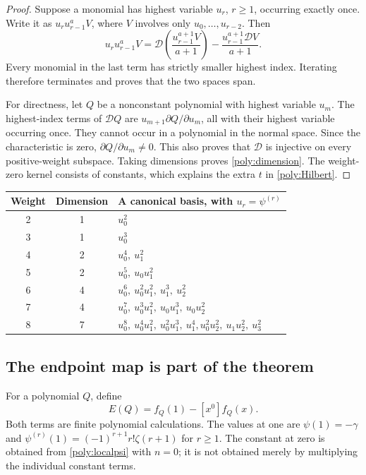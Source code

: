 \documentclass[11pt,a4paper]{article}
\numberwithin{equation}{section}
\theoremstyle{definition}
\theoremstyle{remark}
\newcommand{\cD}{\mathcal D}
\begin{document}
\begin{proof}
Suppose a monomial has highest variable $u_r$, $r\ge1$, occurring
exactly once. Write it as $u_r u_{r-1}^a V$, where $V$ involves
only $u_0,\ldots,u_{r-2}$. Then
\begin{equation}\label{poly:IBPstep}
 u_r u_{r-1}^aV=
 \cD\left(\frac{u_{r-1}^{a+1}V}{a+1}\right)
 -\frac{u_{r-1}^{a+1}\cD V}{a+1}.
\end{equation}
Every monomial in the last term has strictly smaller highest index.
Iterating therefore terminates and proves that the two spaces span.

For directness, let $Q$ be a nonconstant polynomial with highest
variable $u_m$. The highest-index terms of $\cD Q$ are
$u_{m+1}\partial Q/\partial u_m$, all with their highest variable
occurring once. They cannot occur in a polynomial in the normal space.
Since the characteristic is zero, $\partial Q/\partial u_m\ne0$.
This also proves that $\cD$ is injective on every positive-weight
subspace. Taking dimensions proves \eqref{poly:dimension}.
The weight-zero kernel consists of constants, which explains the extra
$t$ in \eqref{poly:Hilbert}.
\end{proof}

\begin{center}
\small
\begin{tabular}{ccl}
\toprule
Weight & Dimension & A canonical basis, with $u_r=\psi^{(r)}$\\
\midrule
2&1&$u_0^2$\\
3&1&$u_0^3$\\
4&2&$u_0^4,\ u_1^2$\\
5&2&$u_0^5,\ u_0u_1^2$\\
6&4&$u_0^6,\ u_0^2u_1^2,\ u_1^3,\ u_2^2$\\
7&4&$u_0^7,\ u_0^3u_1^2,\ u_0u_1^3,\ u_0u_2^2$\\
8&7&$u_0^8,\ u_0^4u_1^2,\ u_0^2u_1^3,\ u_1^4,
 u_0^2u_2^2,\ u_1u_2^2,\ u_3^2$\\
\bottomrule
\end{tabular}
\end{center}

\subsection{The endpoint map is part of the theorem}

For a polynomial $Q$, define
\begin{equation}\label{poly:endpoint}
 E(Q)=f_Q(1)-[x^0]f_Q(x).
\end{equation}
Both terms are finite polynomial calculations. The values at one are
$\psi(1)=-\gamma$ and
$\psi^{(r)}(1)=(-1)^{r+1}r!\zeta(r+1)$ for $r\ge1$.
The constant at zero is obtained from \eqref{poly:localpsi} with $n=0$;
it is not obtained merely by multiplying the individual constant terms.
\end{document}
